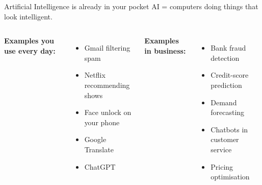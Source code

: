 \documentclass[aspectratio=169, 11pt]{beamer}
\begin{document}
\begin{frame}{Artificial Intelligence is already in your pocket}
    AI = computers doing things that look intelligent.

    \vspace{0.4cm}
    \begin{columns}[T]
        \textbf{Examples you use every day:}
        \begin{itemize}
            \item Gmail filtering spam
            \item Netflix recommending shows
            \item Face unlock on your phone
            \item Google Translate
            \item ChatGPT
        \end{itemize}

        \textbf{Examples in business:}
        \begin{itemize}
            \item Bank fraud detection
            \item Credit-score prediction
            \item Demand forecasting
            \item Chatbots in customer service
            \item Pricing optimisation
        \end{itemize}
    \end{columns}
\end{frame}
\end{document}
